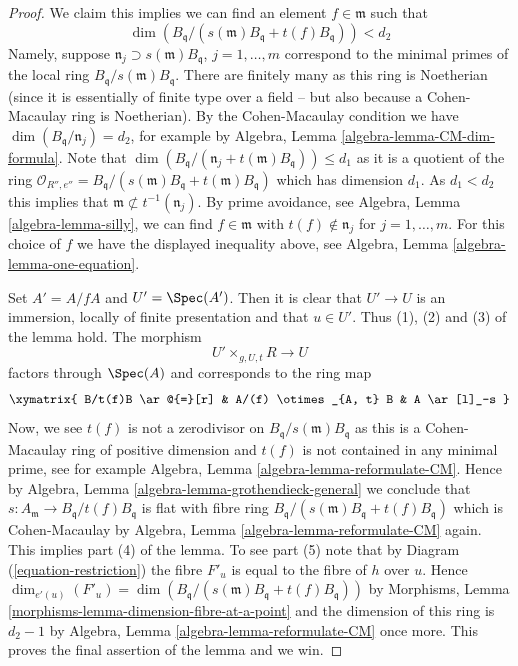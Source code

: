\begin{proof}
\medskip\noindent
We claim this implies we can find
an element $f \in \mathfrak m$ such that
$$
\dim(B_{\mathfrak q}/(s(\mathfrak m)B_{\mathfrak q} + t(f)B_{\mathfrak q})) < d_2
$$
Namely, suppose $\mathfrak n_j \supset s(\mathfrak m)B_{\mathfrak q}$,
$j = 1, \ldots, m$ correspond to the minimal primes of the local ring
$B_{\mathfrak q}/s(\mathfrak m)B_{\mathfrak q}$.
There are finitely many as this ring is Noetherian (since it is essentially
of finite type over a field -- but also because a Cohen-Macaulay ring is
Noetherian). By the Cohen-Macaulay condition we have
$\dim(B_{\mathfrak q}/\mathfrak n_j) = d_2$, for example by
Algebra, Lemma \ref{algebra-lemma-CM-dim-formula}.
Note that
$\dim(B_{\mathfrak q}/(\mathfrak n_j + t(\mathfrak m)B_{\mathfrak q}))
\leq d_1$
as it is a quotient of the ring
$\mathcal{O}_{R'', e''} =
B_{\mathfrak q}/(s(\mathfrak m)B_{\mathfrak q} + t(\mathfrak m)B_{\mathfrak q})$
which has dimension $d_1$. As $d_1 < d_2$ this implies that
$\mathfrak m \not \subset t^{-1}(\mathfrak n_j)$.
By prime avoidance, see
Algebra, Lemma \ref{algebra-lemma-silly},
we can find $f \in \mathfrak m$ with $t(f) \not \in \mathfrak n_j$ for
$j = 1, \ldots, m$. For this choice of $f$ we have
the displayed inequality above, see
Algebra, Lemma \ref{algebra-lemma-one-equation}.

\medskip\noindent
Set $A' = A/fA$ and $U' = \Spec(A')$. Then it is clear that
$U' \to U$ is an immersion, locally of finite presentation
and that $u \in U'$. Thus (1), (2) and (3) of the lemma hold.
The morphism
$$
U' \times_{g, U, t} R \longrightarrow U
$$
factors through $\Spec(A)$ and corresponds to the ring map
$$
\xymatrix{
B/t(f)B \ar@{=}[r] & A/(f) \otimes_{A, t} B & A \ar[l]_-s
}
$$
Now, we see $t(f)$ is not a zerodivisor on
$B_{\mathfrak q}/s(\mathfrak m)B_{\mathfrak q}$ as this is a
Cohen-Macaulay ring of positive dimension and $t(f)$ is not contained
in any minimal prime, see for example
Algebra, Lemma \ref{algebra-lemma-reformulate-CM}.
Hence by
Algebra, Lemma \ref{algebra-lemma-grothendieck-general}
we conclude that $s : A_{\mathfrak m} \to B_{\mathfrak q}/t(f)B_{\mathfrak q}$
is flat with fibre ring
$B_{\mathfrak q}/(s(\mathfrak m)B_{\mathfrak q} + t(f)B_{\mathfrak q})$
which is Cohen-Macaulay by
Algebra, Lemma \ref{algebra-lemma-reformulate-CM}
again. This implies part (4) of the lemma.
To see part (5) note that by Diagram (\ref{equation-restriction})
the fibre $F'_u$ is equal to the fibre of $h$ over $u$.
Hence
$\dim_{e'(u)}(F'_u) =
\dim(B_{\mathfrak q}/(s(\mathfrak m)B_{\mathfrak q} + t(f)B_{\mathfrak q}))$
by
Morphisms, Lemma \ref{morphisms-lemma-dimension-fibre-at-a-point}
and the dimension of this ring is $d_2 - 1$ by
Algebra, Lemma \ref{algebra-lemma-reformulate-CM}
once more. This proves the final assertion of the lemma and we win.
\end{proof}

